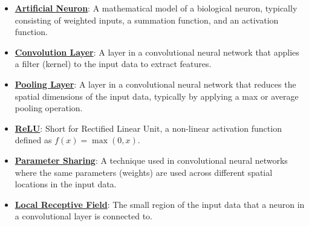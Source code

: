 \documentclass{article}%
\begin{document}
\begin{itemize}[leftmargin=*]
\item \href{https://purdue.brightspace.com/d2l/common/assets/pdfjs-d2l-dist/1.0.14-legacy/web/viewer.html?file=\%2Fcontent\%2Fenforced\%2F1095467-wl.202510.CS.24300.001\%2F09L1-cnn.pdf\%3Fou\%3D1095467\&lang=en-us\&container=d2l-fileviewer-rendered-pdf\&fullscreen=d2l-fileviewer-rendered-pdf-dialog\&height=667#page=5}{\textbf{Artificial Neuron}}: A mathematical model of a biological neuron, typically consisting of weighted inputs, a summation function, and an activation function.%
\item \href{https://purdue.brightspace.com/d2l/common/assets/pdfjs-d2l-dist/1.0.14-legacy/web/viewer.html?file=\%2Fcontent\%2Fenforced\%2F1095467-wl.202510.CS.24300.001\%2F09L1-cnn.pdf\%3Fou\%3D1095467\&lang=en-us\&container=d2l-fileviewer-rendered-pdf\&fullscreen=d2l-fileviewer-rendered-pdf-dialog\&height=667#page=6}{\textbf{Convolution Layer}}: A layer in a convolutional neural network that applies a filter (kernel) to the input data to extract features.%
\item \href{https://purdue.brightspace.com/d2l/common/assets/pdfjs-d2l-dist/1.0.14-legacy/web/viewer.html?file=\%2Fcontent\%2Fenforced\%2F1095467-wl.202510.CS.24300.001\%2F09L1-cnn.pdf\%3Fou\%3D1095467\&lang=en-us\&container=d2l-fileviewer-rendered-pdf\&fullscreen=d2l-fileviewer-rendered-pdf-dialog\&height=667#page=6}{\textbf{Pooling Layer}}: A layer in a convolutional neural network that reduces the spatial dimensions of the input data, typically by applying a max or average pooling operation.%
\item \href{https://purdue.brightspace.com/d2l/common/assets/pdfjs-d2l-dist/1.0.14-legacy/web/viewer.html?file=\%2Fcontent\%2Fenforced\%2F1095467-wl.202510.CS.24300.001\%2F09L1-cnn.pdf\%3Fou\%3D1095467\&lang=en-us\&container=d2l-fileviewer-rendered-pdf\&fullscreen=d2l-fileviewer-rendered-pdf-dialog\&height=667#page=13}{\textbf{ReLU}}: Short for Rectified Linear Unit, a non-linear activation function defined as $f(x) = \max(0, x)$.%
\item \href{https://purdue.brightspace.com/d2l/common/assets/pdfjs-d2l-dist/1.0.14-legacy/web/viewer.html?file=\%2Fcontent\%2Fenforced\%2F1095467-wl.202510.CS.24300.001\%2F09L1-cnn.pdf\%3Fou\%3D1095467\&lang=en-us\&container=d2l-fileviewer-rendered-pdf\&fullscreen=d2l-fileviewer-rendered-pdf-dialog\&height=667#page=12}{\textbf{Parameter Sharing}}: A technique used in convolutional neural networks where the same parameters (weights) are used across different spatial locations in the input data.%
\item \href{https://purdue.brightspace.com/d2l/common/assets/pdfjs-d2l-dist/1.0.14-legacy/web/viewer.html?file=\%2Fcontent\%2Fenforced\%2F1095467-wl.202510.CS.24300.001\%2F09L1-cnn.pdf\%3Fou\%3D1095467\&lang=en-us\&container=d2l-fileviewer-rendered-pdf\&fullscreen=d2l-fileviewer-rendered-pdf-dialog\&height=667#page=10}{\textbf{Local Receptive Field}}: The small region of the input data that a neuron in a convolutional layer is connected to.%

\end{itemize}
\end{document}
